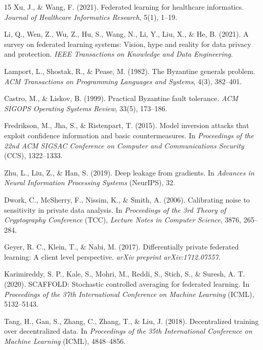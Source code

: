 \documentclass[12pt]{report}
\begin{document}
\begin{thebibliography}{15}
Xu, J., \& Wang, F. (2021). Federated learning for healthcare informatics.
\textit{Journal of Healthcare Informatics Research}, 5(1), 1--19.

Li, Q., Wen, Z., Wu, Z., Hu, S., Wang, N., Li, Y., Liu, X., \& He, B.
(2021). A survey on federated learning systems: Vision, hype and reality
for data privacy and protection. \textit{IEEE Transactions on Knowledge
and Data Engineering}.

Lamport, L., Shostak, R., \& Pease, M. (1982). The Byzantine generals
problem. \textit{ACM Transactions on Programming Languages and Systems},
4(3), 382--401.

Castro, M., \& Liskov, B. (1999). Practical Byzantine fault tolerance.
\textit{ACM SIGOPS Operating Systems Review}, 33(5), 173--186.

Fredrikson, M., Jha, S., \& Ristenpart, T. (2015). Model inversion attacks
that exploit confidence information and basic countermeasures. In
\textit{Proceedings of the 22nd ACM SIGSAC Conference on Computer and
Communications Security} (CCS), 1322--1333.

Zhu, L., Liu, Z., \& Han, S. (2019). Deep leakage from gradients.
In \textit{Advances in Neural Information Processing Systems} (NeurIPS), 32.

Dwork, C., McSherry, F., Nissim, K., \& Smith, A. (2006). Calibrating noise
to sensitivity in private data analysis. In \textit{Proceedings of the 3rd
Theory of Cryptography Conference} (TCC), \textit{Lecture Notes in Computer
Science}, 3876, 265--284.

Geyer, R. C., Klein, T., \& Nabi, M. (2017). Differentially private federated
learning: A client level perspective. \textit{arXiv preprint arXiv:1712.07557}.

Karimireddy, S. P., Kale, S., Mohri, M., Reddi, S., Stich, S., \& Suresh,
A. T. (2020). SCAFFOLD: Stochastic controlled averaging for federated learning.
In \textit{Proceedings of the 37th International Conference on Machine
Learning} (ICML), 5132--5143.

Tang, H., Gan, S., Zhang, C., Zhang, T., \& Liu, J. (2018). Decentralized
training over decentralized data. In \textit{Proceedings of the 35th
International Conference on Machine Learning} (ICML), 4848--4856.

\end{thebibliography}
\end{document}
